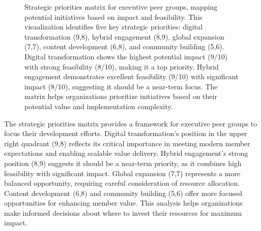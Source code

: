 \documentclass[conference]{IEEEtran}
\begin{document}
\begin{figure}[t]
\centering
{}
\caption{Strategic priorities matrix for executive peer groups, mapping potential initiatives based on impact and feasibility. This visualization identifies five key strategic priorities: digital transformation (9,8), hybrid engagement (8,9), global expansion (7,7), content development (6,8), and community building (5,6). Digital transformation shows the highest potential impact (9/10) with strong feasibility (8/10), making it a top priority. Hybrid engagement demonstrates excellent feasibility (9/10) with significant impact (8/10), suggesting it should be a near-term focus. The matrix helps organizations prioritize initiatives based on their potential value and implementation complexity.}
\label{fig:priorities_matrix}
\end{figure}

The strategic priorities matrix provides a framework for executive peer groups to focus their development efforts. Digital transformation's position in the upper right quadrant (9,8) reflects its critical importance in meeting modern member expectations and enabling scalable value delivery. Hybrid engagement's strong position (8,9) suggests it should be a near-term priority, as it combines high feasibility with significant impact. Global expansion (7,7) represents a more balanced opportunity, requiring careful consideration of resource allocation. Content development (6,8) and community building (5,6) offer more focused opportunities for enhancing member value. This analysis helps organizations make informed decisions about where to invest their resources for maximum impact.
\end{document}
